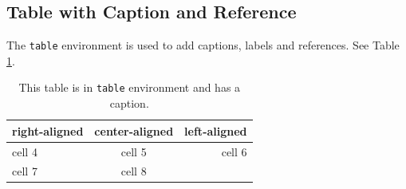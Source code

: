 	\subsection{Table with Caption and Reference}
	
		The \verb|table| environment is used to add captions, labels and references. See Table \ref{tab1}.
		
		\begin{table}[h]
			\centering
			\begin{tabular}{|l|c|r|}
				\hline
				right-aligned 	& center-aligned 	& left-aligned \\
				\hline
				cell 4 			& cell 5 			& cell 6 	   \\
				cell 7 			& cell 8 			&\\
				\hline
			\end{tabular}
			\caption{This table is in \texttt{table} environment and has a caption.}
			\label{tab1}
		\end{table}


